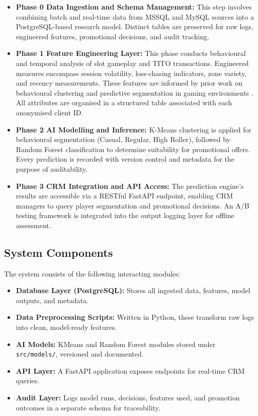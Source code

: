 \documentclass[12pt,a4paper]{report}
\begin{document}
\begin{itemize}

  \item \textbf{Phase 0 \textendash{} Data Ingestion and Schema Management:} 
  This step involves combining batch and real-time data from MSSQL and MySQL sources into a PostgreSQL-based research model. Distinct tables are preserved for raw logs, engineered features, promotional decisions, and audit tracking.

  \item \textbf{Phase 1 \textendash{} Feature Engineering Layer:} 
  This phase conducts behavioural and temporal analysis of slot gameplay and TITO transactions. Engineered measures encompass session volatility, loss-chasing indicators, zone variety, and recency measurements. These features are informed by prior work on behavioural clustering and predictive segmentation in gaming environments \citep{Desiata2024b, Omike2022b}. All attributes are organised in a structured table associated with each anonymised client ID.

  \item \textbf{Phase 2 \textendash{} AI Modelling and Inference:} 
  K-Means clustering is applied for behavioural segmentation (Casual, Regular, High Roller), followed by Random Forest classification to determine suitability for promotional offers. Every prediction is recorded with version control and metadata for the purpose of auditability.

  \item \textbf{Phase 3 \textendash{} CRM Integration and API Access:} 
  The prediction engine's results are accessible via a RESTful FastAPI endpoint, enabling CRM managers to query player segmentation and promotional decisions. An A/B testing framework is integrated into the output logging layer for offline assessment.

\end{itemize}

\subsection{System Components}

The system consists of the following interacting modules:

\begin{itemize}
  \item \textbf{Database Layer (PostgreSQL):} Stores all ingested data, features, model outputs, and metadata.
  \item \textbf{Data Preprocessing Scripts:} Written in Python, these transform raw logs into clean, model-ready features.
  \item \textbf{AI Models:} KMeans and Random Forest modules stored under \texttt{src/models/}, versioned and documented.
  \item \textbf{API Layer:} A FastAPI application exposes endpoints for real-time CRM queries.
  \item \textbf{Audit Layer:} Logs model runs, decisions, features used, and promotion outcomes in a separate schema for traceability.
\end{itemize}
\end{document}
